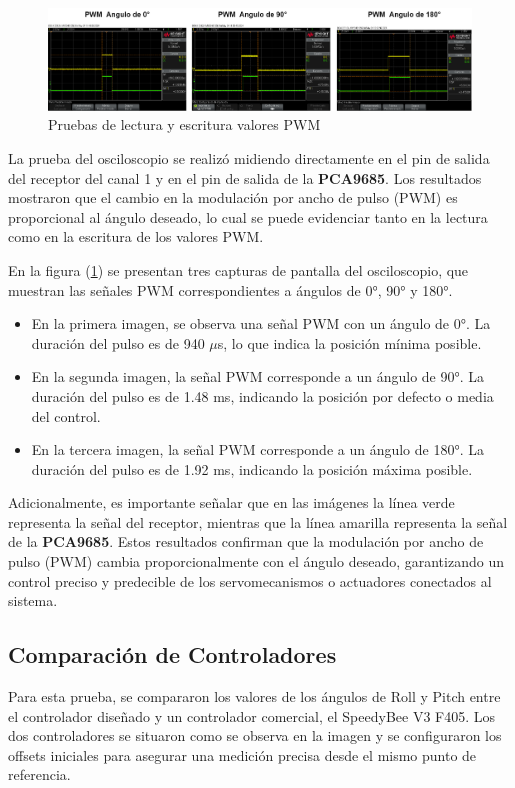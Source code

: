 \begin{figure}[H]
    \centering
    \includegraphics[width=7 in]{Imagenes/Pruebas/pwm canales.png}
    \caption{Pruebas de lectura y escritura valores PWM}
    \label{fig:pruebasPWM}
\end{figure}

La prueba del osciloscopio se realizó midiendo directamente en el pin de salida del receptor del canal 1 y en el pin de salida de la \textbf{PCA9685}. Los resultados mostraron que el cambio en la modulación por ancho de pulso (PWM) es proporcional al ángulo deseado, lo cual se puede evidenciar tanto en la lectura como en la escritura de los valores PWM.

En la figura (\ref{fig:pruebasPWM}) se presentan tres capturas de pantalla del osciloscopio, que muestran las señales PWM correspondientes a ángulos de 0°, 90° y 180°. 

\begin{itemize}
    \item En la primera imagen, se observa una señal PWM con un ángulo de 0°. La duración del pulso es de 940 $\mu$s, lo que indica la posición mínima posible.
    \item En la segunda imagen, la señal PWM corresponde a un ángulo de 90°. La duración del pulso es de 1.48 ms, indicando la posición por defecto o media del control.
    \item En la tercera imagen, la señal PWM corresponde a un ángulo de 180°. La duración del pulso es de 1.92 ms, indicando la posición máxima posible.
\end{itemize}

Adicionalmente, es importante señalar que en las imágenes la línea verde representa la señal del receptor, mientras que la línea amarilla representa la señal de la \textbf{PCA9685}. Estos resultados confirman que la modulación por ancho de pulso (PWM) cambia proporcionalmente con el ángulo deseado, garantizando un control preciso y predecible de los servomecanismos o actuadores conectados al sistema.
\vspace{5 px}
\subsection{Comparación de Controladores}
\vspace{5 px}
Para esta prueba, se compararon los valores de los ángulos de Roll y Pitch entre el controlador diseñado y un controlador comercial, el SpeedyBee V3 F405. Los dos controladores se situaron como se observa en la imagen y se configuraron los offsets iniciales para asegurar una medición precisa desde el mismo punto de referencia.
\vspace{5 px}


